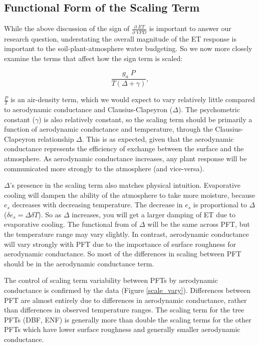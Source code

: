 \documentclass[draft,linenumbers]{agujournal}
\begin{document}
\subsection{Functional Form of the Scaling Term}
\label{scale_term}
While the above discussion of the sign of $\frac{\partial \; ET}{\partial \; VPD}$ is important to answer our research question, understating the overall magnitude of the ET response is important to the soil-plant-atmosphere water budgeting. So we now more closely examine the terms that affect how the sign term is scaled:

\begin{equation}
  \frac{g_a \; P}{T(\Delta + \gamma)},
\end{equation}

$\frac{P}{T}$ is an air-density term, which we would expect to vary relatively little compared to aerodynamic conductance and Clausius-Clapeyron ($\Delta$). The psychometric constant ($\gamma$) is also relatively constant, so the scaling term should be primarily a function of aerodynamic conductance and temperature, through the Clausius-Clapeyron relationship $\Delta$. This is as expected, given that the aerodynamic conductance represents the efficiency of exchange between the surface and the atmosphere. As aerodynamic conductance  increases, any plant response will be communicated more strongly to the atmosphere (and vice-versa).

$\Delta$'s presence in the scaling term also matches physical intuition. Evaporative cooling will dampen the ability of the atmosphere to take more moisture, because $e_{s}$ decreases with decreasing temperature. The decrease in $e_{s}$ is proportional to $\Delta$ ($\delta e_{s} = \Delta \delta T$). So as $\Delta$ increases, you will get a larger damping of ET due to evaporative cooling.  The functional from of $\Delta$ will be the same across PFT, but the temperature range may vary slightly. In contrast, aerodynamic conductance will vary strongly with PFT due to the importance of surface roughness for aerodynamic conductance. So most of the differences in scaling between PFT should be in the aerodynamic conductance term. 

The control of scaling term variability between PFTs by aerodynamic conductance is confirmed by the data (Figure \ref{scale_vary}). Differences between PFT are almost entirely due to differences in aerodynamic conductance, rather than differences in observed temperature ranges. The scaling term for the tree PFTs (DBF, ENF) is generally more than double the scaling terms for the other PFTs which have lower surface roughness and generally smaller aerodynamic conductance.
\end{document}
